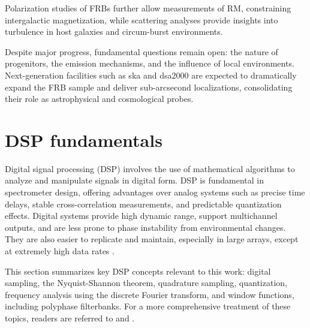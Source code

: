 Polarization studies of FRBs further allow measurements of RM, constraining intergalactic magnetization, while scattering analyses provide insights into turbulence in host galaxies and circum-burst environments.

Despite major progress, fundamental questions remain open: the nature of progenitors, the emission mechanisms, and the influence of local environments. Next-generation facilities such as \gls{ska} \citep{Weltman_2020} and \gls{dsa2000} \citep{hallinan2019dsa2000radiosurvey} are expected to dramatically expand the FRB sample and deliver sub-arcsecond localizations, consolidating their role as astrophysical and cosmological probes.


\section{DSP fundamentals}
Digital signal processing (DSP) involves the use of mathematical algorithms to analyze and manipulate signals in digital form. DSP is fundamental in spectrometer design, offering advantages over analog systems such as precise time delays, stable cross-correlation measurements, and predictable quantization effects. Digital systems provide high dynamic range, support multichannel outputs, and are less prone to phase instability from environmental changes. They are also easier to replicate and maintain, especially in large arrays, except at extremely high data rates \citep{thompson2017interferometry}. 


This section summarizes key DSP concepts relevant to this work: digital sampling, the Nyquist-Shannon theorem, quadrature sampling, quantization, frequency analysis using the discrete Fourier transform, and window functions, including polyphase filterbanks. For a more comprehensive treatment of these topics, readers are referred to \citet{Proakis1996digital} and \citet{Crockett2023}.

